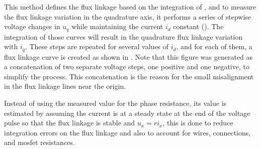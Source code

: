 This method defines the flux linkage based on the integration of , and to measure the flux linkage variation in the quadrature axis, it performs a series of stepwise voltage changes in $u_q$ while maintaining the current $i_d$ constant (). The integration of those curves will result in the quadrature flux linkage variation with $i_q$. These steps are repeated for several values of $i_d$, and for each of them, a flux linkage curve is created as shown in . Note that this figure was generated as a concatenation of two separate voltage steps, one positive and one negative, to simplify the process. This concatenation is the reason for the small misalignment in the flux linkage lines near the origin.

Instead of using the measured value for the phase resistance, its value is estimated by assuming the current is at a steady state at the end of the voltage pulse so that the flux linkage is stable and $u_x = ri_x$, this is done to reduce integration errors on the flux linkage and also to account for wires, connections, and \gls{mosfet} resistances.

